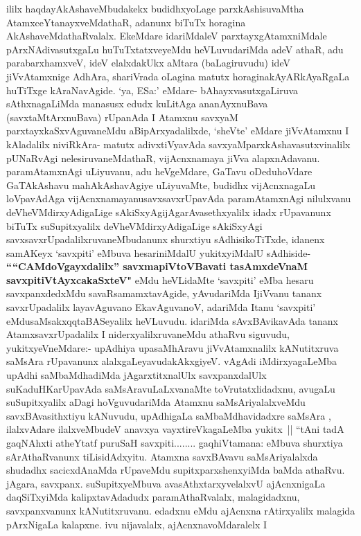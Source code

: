\begin{artha}
ililx haqdayAkAshaveMbudakekx budidhxyoLage parxkAshisuvaMtha
AtamxceYtanayx\break veMdathaR, adanunx biTuTx horagina
AkAshaveMdathaRvalalx. EkeMdare idariMdaleV parxtayxgAtamxniMdale
pArxNAdivasutxgaLu huTuTxtatxveyeMdu heVLuvudariMda adeV athaR, adu
parabarxhamxveV, ideV elalxdakUkx aMtara (baLagiruvudu) ideV
jiVvAtamxnige AdhAra, shariVrada oLagina matutx horaginakAyARkAyaRgaLa
huTiTxge kAraNavAgide. `ya, ESa:' eMdare- bAhayxvasutxgaLiruva
sAthxnagaLiMda manasusx edudx kuLitAga ananAyxnuBava
(savxtaMtArxnuBava) rUpanAda I Atamxnu savxyaM parxtayxkaSxvAguvaneMdu
aBipArxyadalilxde, `sheVte' eMdare \ndash jiVvAtamxnu I kAladalilx
niviRkAra- matutx adivxtiVyavAda savxyaMparxkAshavasutxvinalilx
pUNaRvAgi nelesiruvaneMdathaR, vijAcnxnamaya jiVva
alapxnAdavanu. paramAtamxnAgi uLiyuvanu, adu heVgeMdare, 
GaTavu oDeduhoVdare GaTAkAshavu mahAkAshavAgiye uLiyuvaMte, budidhx vijAcnxnagaLu
loVpavAdAga vijAcnxnamayanu\break savxsavxrUpavAda paramAtamxnAgi nilulxvanu
deVheVMdirxyAdigaLige sAkiSxyAgi\break jAgarAvasethxyalilx idadx rUpavanunx
biTuTx suSupitxyalilx deVheVMdirxyAdigaLige
sAkiSxyAgi savxsavxrUpadalilxruvaneMbudanunx shurxtiyu sAdhisikoTiTxde, idanenx
samAKeyx `savxpiti' eMbuva hesariniMdalU yukitxyiMdalU sAdhiside-
\textbf{````CAMdoVgayxdalilx'' savxmapiVtoVBavati  tasAmxdeVnaM
savxpitiVtAyxcakaSxteV"} eMdu heVLidaMte `savxpiti' eMba hesaru
savxpanxdedxMdu savaRsamamxtavAgide, yAvudariMda IjiVvanu tananx
savxrUpadalilx layavAguvano EkavAguvanoV, adariMda Itanu `savxpiti'
eMdu\break saMsakxqqtaBASeyalilx heVLuvudu. idariMda sAvxBAvikavAda tananx
AtamxsavxrUpadalilx I niderxyalilxruvaneMdu
athaRvu siguvudu, yukitxyeVneMdare:- upAdhiya upasaMhAravu
jiVvAtamxnalilx kANutitxruva saMsAra rUpavanunx
alalxgaLeyavudakAkxgiyeV. vAgAdi iMdirxyagaLeMba upAdhi saMbaMdhadiMda
jAgarxtitxnalUlx savxpanxdalUlx suKaduHKarUpavAda saMsAravuLaLxvanaMte
toVrutatxlidadxnu, avugaLu suSupitxyalilx aDagi hoVguvudariMda Atamxnu
saMsAriyalalxveMdu savxBAvasithxtiyu kANuvudu, upAdhigaLa
saMbaMdhavidadxre saMsAra , ilalxvAdare ilalxveMbudeV anavxya
vayxtireVkagaLeMba yukitx~|| ``tAni tadA gaqNAhxti atheYtatf puruSaH
savxpiti........ gaqhiVtamana: eMbuva shurxtiya sArAthaRvanunx
tiLisidAdxyitu. Atamxna savxBAvavu saMsAriyalalxda shudadhx
sacicxdAnaMda rUpaveMdu supitxparxshenxyiMda baMda athaRvu. jAgara,
savxpanx. suSupitxyeMbuva avasAthxtarxyvelalxvU ajAcnxnigaLa
daqSiTxyiMda kalipxtavAdadudx paramAthaRvalalx, malagidadxnu,
savxpanxvanunx kANutitxruvanu. edadxnu eMdu ajAcnxna rAtirxyalilx malagida
pArxNigaLa kalapxne. ivu nijavalalx, ajAcnxnavoMdaralelx I

\end{artha}
